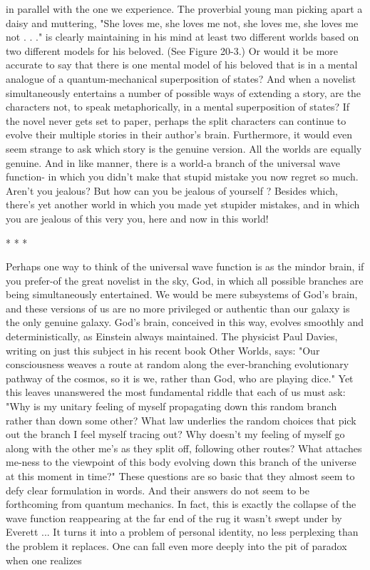 in parallel with the one we experience. The proverbial young man picking apart a
daisy and muttering, "She loves me, she loves me not, she loves me, she loves me not
. . ." is clearly maintaining in his mind at least two different worlds based on two
different models for his beloved. (See Figure 20-3.) Or would it be more accurate to
say that there is one mental model of his beloved that is in a mental analogue of a
quantum-mechanical superposition of states?
         And when a novelist simultaneously entertains a number of possible ways of
extending a story, are the characters not, to speak metaphorically, in a mental
superposition of states? If the novel never gets set to paper, perhaps the split
characters can continue to evolve their multiple stories in their author's brain.
Furthermore, it would even seem strange to ask which story is the genuine version.
All the worlds are equally genuine.
         And in like manner, there is a world-a branch of the universal wave function-
in which you didn't make that stupid mistake you now regret so much. Aren't you
jealous? But how can you be jealous of yourself ? Besides which, there's yet another
world in which you made yet stupider mistakes, and in which you are jealous of this
very you, here and now in this world!

                                        * *    *

         Perhaps one way to think of the universal wave function is as the mindor
brain, if you prefer-of the great novelist in the sky, God, in which all possible
branches are being simultaneously entertained. We would be mere subsystems of
God's brain, and these versions of us are no more privileged or authentic than our
galaxy is the only genuine galaxy. God's brain, conceived in this way, evolves
smoothly and deterministically, as Einstein always maintained. The physicist Paul
Davies, writing on just this subject in his recent book Other Worlds, says: "Our
consciousness weaves a route at random along the ever-branching evolutionary
pathway of the cosmos, so it is we, rather than God, who are playing dice."
         Yet this leaves unanswered the most fundamental riddle that each of us must
ask: "Why is my unitary feeling of myself propagating down this random branch
rather than down some other? What law underlies the random choices that pick out
the branch I feel myself tracing out? Why doesn't my feeling of myself go along with
the other me's as they split off, following other routes? What attaches me-ness to the
viewpoint of this body evolving down this branch of the universe at this moment in
time?" These questions are so basic that they almost seem to defy clear formulation in
words. And their answers do not seem to be forthcoming from quantum mechanics. In
fact, this is exactly the collapse of the wave function reappearing at the far end of the
rug it wasn't swept under by Everett ...
         It turns it into a problem of personal identity, no less perplexing than the
problem it replaces.
         One can fall even more deeply into the pit of paradox when one realizes





